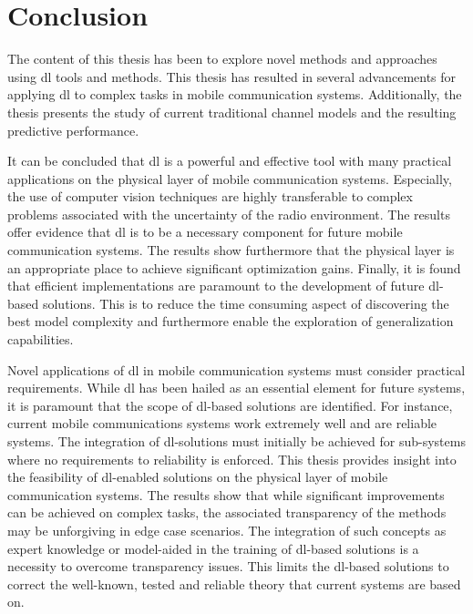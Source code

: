 \chapter{Conclusion}\label{ch:conclusion}

The content of this thesis has been to explore novel methods and approaches using \gls{dl} tools and methods. This thesis has resulted in several advancements for applying \gls{dl} to complex tasks in mobile communication systems. Additionally, the thesis presents the study of current traditional channel models and the resulting predictive performance. 

It can be concluded that \gls{dl} is a powerful and effective tool with many practical applications on the physical layer of mobile communication systems. Especially, the use of computer vision techniques are highly transferable to complex problems associated with the uncertainty of the radio environment. The results offer evidence that \gls{dl} is to be a necessary component for future mobile communication systems. The results show furthermore that the physical layer is an appropriate place to achieve significant optimization gains. Finally, it is found that efficient implementations are paramount to the development of future \gls{dl}-based solutions. This is to reduce the time consuming aspect of discovering the best model complexity and furthermore enable the exploration of generalization capabilities. 

Novel applications of \gls{dl} in mobile communication systems must consider practical requirements. While \gls{dl} has been hailed as an essential element for future systems, it is paramount that the scope of \gls{dl}-based solutions are identified. For instance, current mobile communications systems work extremely well and are reliable systems. The integration of \gls{dl}-solutions must initially be achieved for sub-systems where no requirements to reliability is enforced. This thesis provides insight into the feasibility of \gls{dl}-enabled solutions on the physical layer of mobile communication systems. The results show that while significant improvements can be achieved on complex tasks, the associated transparency of the methods may be unforgiving in edge case scenarios. The integration of such concepts as expert knowledge or model-aided in the training of \gls{dl}-based solutions is a necessity to overcome transparency issues. This limits the \gls{dl}-based solutions to correct the well-known, tested and reliable theory that current systems are based on. 
